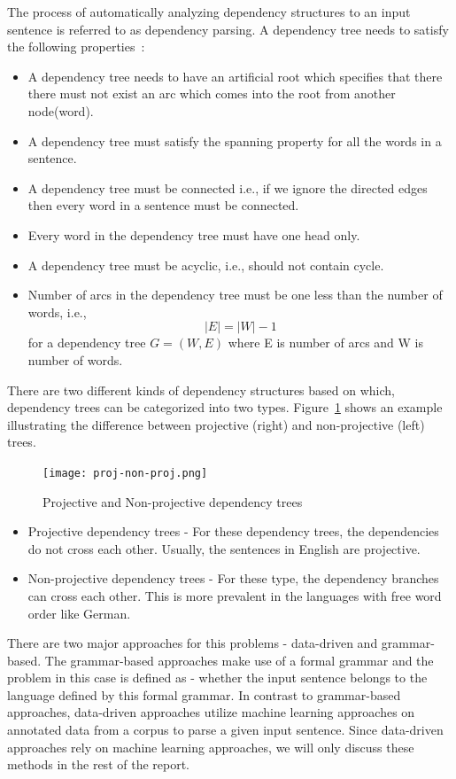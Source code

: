 The process of automatically analyzing dependency structures to an input sentence is referred to as dependency parsing. A dependency tree needs to satisfy the following properties~\cite{kubler2009dependency}:
\begin{itemize}
\item A dependency tree needs to have an artificial root which specifies that there there must not exist an arc which comes into the root from another node(word).
\item A dependency tree must satisfy the spanning property for all the words in a sentence.
\item A dependency tree must be connected i.e., if we ignore the directed edges then every word in a sentence must be connected.
\item Every word in the dependency tree must have one head only.
\item A dependency tree must be acyclic, i.e., should not contain cycle.
\item Number of arcs in the dependency tree must be one less than the number of words, i.e., $$|E| = |W| - 1$$ for a dependency tree $G = (W,E)$ where E is number of arcs and W is number of words.
\end{itemize}

There are two different kinds of dependency structures based on which, dependency trees can be categorized into two types. Figure~\ref{fig:proj-non-proj} shows an example illustrating the difference between projective (right) and non-projective (left) trees.  

\begin{figure}[!htb]
    \centering
    \texttt{[image: proj-non-proj.png]}
    \centering
    \caption{Projective and Non-projective dependency trees~\cite{kubler2009dependency}}
    \label{fig:proj-non-proj}
\end{figure}

\begin{itemize}
    \item Projective dependency trees - For these dependency trees, the dependencies do not cross each other. Usually, the sentences in English are projective.
    \item Non-projective dependency trees - For these type, the dependency branches can cross each other. This is more prevalent in the languages with free word order like German.
    
\end{itemize}


There are two major approaches for this problems - data-driven and grammar-based. The grammar-based approaches make use of a formal grammar and the problem in this case is defined as - whether the input sentence belongs to the language defined by this formal grammar. In contrast to grammar-based approaches, data-driven approaches utilize machine learning approaches on annotated data from a corpus to parse a given input sentence. Since data-driven approaches rely on machine learning approaches, we will only discuss these methods in the rest of the report.


